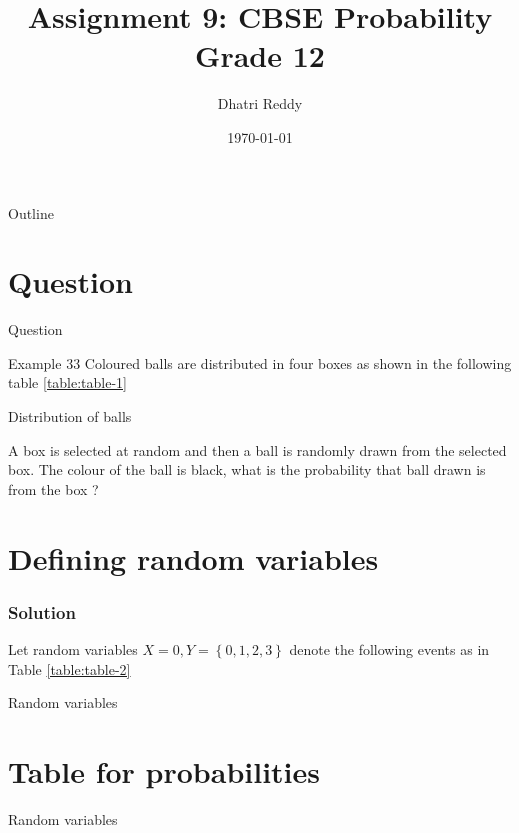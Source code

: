 \documentclass{beamer}
\title{Assignment 9: CBSE Probability Grade 12 }
\author{Dhatri Reddy}
\date{\today}
\providecommand{\cbrak}[1]{\ensuremath{\left\{#1\right\}}}
\begin{document}
\begin{frame}
    \titlepage 
\end{frame}

\logo{}

\begin{frame}{Outline}
    \tableofcontents
\end{frame}

\section{Question}
\begin{frame}{Question}
    \begin{block}{Example 33}
        Coloured balls are distributed in four boxes as shown in the following table \eqref{table:table-1}
    
\begin{table}[ht!]
\centering
	
	\vspace*{5pt}
\caption{Distribution of balls}
	\label{table:table-1}
\end{table}
A box is selected at random and then a ball is randomly drawn from the selected box. The colour of the ball is black, what is the probability that ball drawn is from the box ?
\end{block}
\end{frame}

\section{Defining random variables}
\begin{frame}
\frametitle{Solution}
Let random variables $X = 0, Y=\cbrak{0,1,2,3}$ denote the following events as in Table \eqref{table:table-2}
\begin{table}[ht!]
\centering
	
	\vspace*{5pt}
\caption{Random variables}
	\label{table:table-2}
\end{table}
\end{frame}

\section{Table for probabilities}
\begin{frame}
\begin{table}[ht!]
\centering
	
	\vspace*{5pt}
\caption{Random variables}
	\label{table:table-3}
\end{table}
\end{frame}
\end{document}
